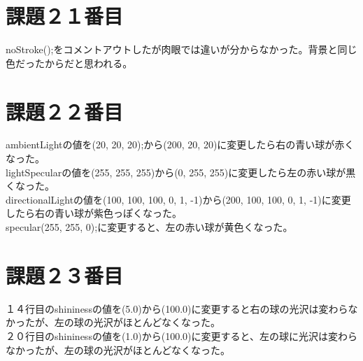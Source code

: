 \documentclass{jsarticle}
\begin{document}
\section{課題２１番目}
noStroke();をコメントアウトしたが肉眼では違いが分からなかった。背景と同じ色だったからだと思われる。
\section{課題２２番目}
ambientLightの値を(20, 20, 20);から(200, 20, 20)に変更したら右の青い球が赤くなった。\\
lightSpecularの値を(255, 255, 255)から(0, 255, 255)に変更したら左の赤い球が黒くなった。\\
directionalLightの値を(100, 100, 100, 0, 1, -1)から(200, 100, 100, 0, 1, -1)に変更したら右の青い球が紫色っぽくなった。\\
specular(255, 255, 0);に変更すると、左の赤い球が黄色くなった。\\
\section{課題２３番目}
１４行目のshininessの値を(5.0)から(100.0)に変更すると右の球の光沢は変わらなかったが、左の球の光沢がほとんどなくなった。\\
２０行目のshininessの値を(1.0)から(100.0)に変更すると、左の球に光沢は変わらなかったが、左の球の光沢がほとんどなくなった。\\
\end{document}
